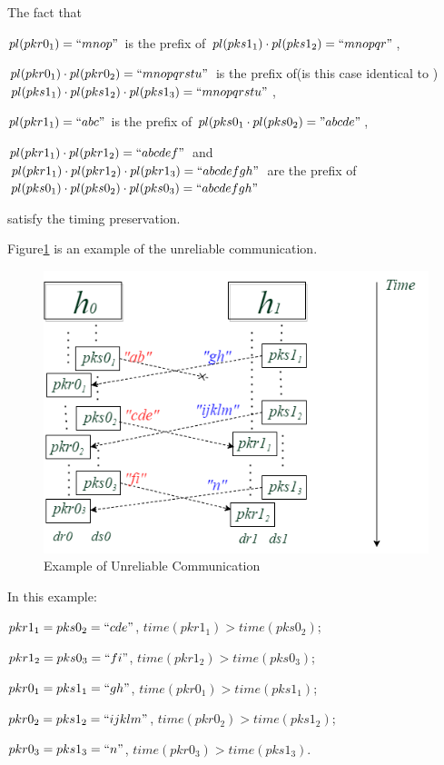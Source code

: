 The fact that
 
$pl(pkr0_1) = ``mnop"$ is the prefix of $pl(pks1_1) \cdot  pl(pks1_2) = ``mnopqr"$,

$pl(pkr0_1) \cdot pl(pkr0_2)=``mnopqrstu"$ is the prefix of(is this case identical to ) $pl(pks1_1) \cdot pl(pks1_2) \cdot pl(pks1_3) = ``mnopqrstu" $,  

$pl(pkr1_1)=``abc"$ is the prefix of $pl(pks0_1 \cdot pl(pks0_2) = "abcde"$,  

$pl(pkr1_1) \cdot pl(pkr1_2)= ``abcdef"$ and  $pl(pkr1_1) \cdot pl(pkr1_2) \cdot pl(pkr1_3) = ``abcdefgh"$ are  the prefix of  $pl(pks0_1) \cdot pl(pks0_2) \cdot pl(pks0_3)= ``abcdefgh"$

satisfy the timing preservation. 


Figure\ref{unreliableexample} is an example of the unreliable communication. 

\begin{figure}[H]
\centerline{\includegraphics[scale=0.55]{Figures/unreliableexample}}
\caption{Example of Unreliable Communication}
\label{unreliableexample}
\end{figure}

In this example:

$pkr1_1 = pks0_2=``cde"$, $time(pkr1_1) > time(pks0_2)$; 

$pkr1_2 = pks0_3=``fi"$, $time(pkr1_2) > time(pks0_3)$;

$pkr0_1 = pks1_1=``gh"$, $time(pkr0_1) > time(pks1_1)$;

$pkr0_2 = pks1_2=``ijklm"$, $time(pkr0_2) > time(pks1_2)$;

$pkr0_3 = pks1_3=``n"$, $time(pkr0_3) > time(pks1_3)$.

